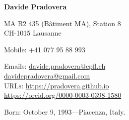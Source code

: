 \documentclass[11pt]{article} %
\begin{document}

\begin{minipage}[c]{.75\textwidth}
{\huge\bfseries Davide Pradovera} %
\bigskip\bigskip\medskip %

MA B2 435 (B\^atiment MA), Station 8 \\
CH-1015 Lausanne
\medskip %

Mobile: +41 077 95 88 993 %
\medskip %

Emails: \href{mailto:davide.pradovera@epfl.ch}{davide.pradovera@epfl.ch}\\ %
\phantom{Emails: }\href{mailto:davidepradovera@gmail.com}{davidepradovera@gmail.com}\\ %
\textsc{URLs}: \href{https://pradovera.github.io}{https://pradovera.github.io}\\ %
\href{https://orcid.org/0000-0003-0398-1580}{https://orcid.org/0000-0003-0398-1580}\\ %
\end{minipage}\hfill%
\begin{minipage}[c]{.225\textwidth}
\end{minipage}\hfill%

\smallskip %


Born: October 9, 1993---Piacenza, Italy. %
\end{document}
